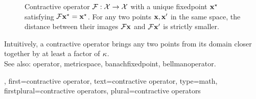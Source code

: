 {{\begin{figure}[H]
    		\caption{Contractive \gls{operator} $\mathcal{F}:\mathcal{X}\to\mathcal{X}$ 
      			with a unique \gls{fixedpoint} ${\bf x}^\star$ satisfying $\mathcal{F} {\bf x}^\star={\bf x}^\star$.
      			For any two points ${\bf x},{\bf x}'$ in the same space, the \gls{distance} between their images
      			$\mathcal{F}{\bf x}$ and $\mathcal{F}{\bf x}'$ is strictly smaller.}
    			\label{fig:contract_dict}
		\end{figure}
		Intuitively, a contractive \gls{operator} brings any two points 
		from its \gls{domain} closer together by at least a factor of $\kappa$.
		\\ 
		See also: \gls{operator}, \gls{metricspace}, \gls{banachfixedpoint}, \gls{bellmanoperator}. },
	first={contractive operator},
	text={contractive operator}, 
	type=math,
	firstplural={contractive operators}, 
	plural={contractive operators}
}


